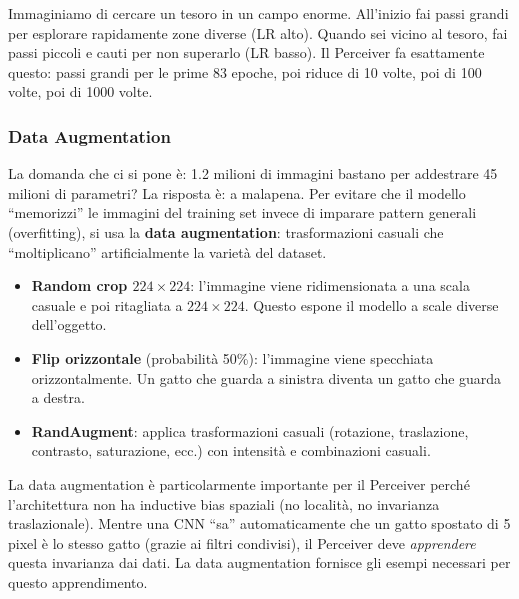 \documentclass[12pt,a4paper]{article}
\begin{document}
\begin{notabox}
Immaginiamo di cercare un tesoro in un campo enorme. All'inizio fai passi grandi per esplorare rapidamente zone diverse (LR alto). Quando sei vicino al tesoro, fai passi piccoli e cauti per non superarlo (LR basso). Il Perceiver fa esattamente questo: passi grandi per le prime 83 epoche, poi riduce di 10 volte, poi di 100 volte, poi di 1000 volte.
\end{notabox}

\subsubsection{Data Augmentation} \label{sec:data_augment}

La domanda che ci si pone \`e: 1.2 milioni di immagini bastano per addestrare 45 milioni di parametri? La risposta \`e: a malapena. Per evitare che il modello ``memorizzi'' le immagini del training set invece di imparare pattern generali (overfitting), si usa la \textbf{data augmentation}: trasformazioni casuali che ``moltiplicano'' artificialmente la variet\`a del dataset.

\begin{itemize}
    \item \textbf{Random crop $224 \times 224$}: l'immagine viene ridimensionata a una scala casuale e poi ritagliata a $224 \times 224$. Questo espone il modello a scale diverse dell'oggetto.
    \item \textbf{Flip orizzontale} (probabilit\`a 50\%): l'immagine viene specchiata orizzontalmente. Un gatto che guarda a sinistra diventa un gatto che guarda a destra.
    \item \textbf{RandAugment}: applica trasformazioni casuali (rotazione, traslazione, contrasto, saturazione, ecc.) con intensit\`a e combinazioni casuali.
\end{itemize}

\begin{notabox}
La data augmentation \`e particolarmente importante per il Perceiver perch\'e l'architettura non ha inductive bias spaziali (no localit\`a, no invarianza traslazionale). Mentre una CNN ``sa'' automaticamente che un gatto spostato di 5 pixel \`e lo stesso gatto (grazie ai filtri condivisi), il Perceiver deve \emph{apprendere} questa invarianza dai dati. La data augmentation fornisce gli esempi necessari per questo apprendimento.
\end{notabox}
\end{document}
